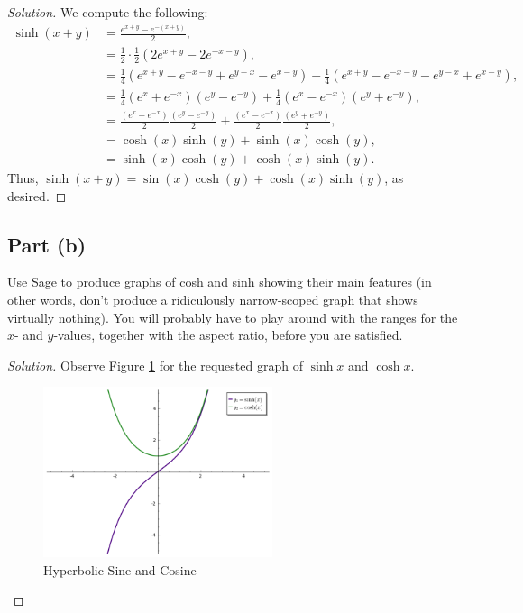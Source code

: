 \documentclass[letterpaper, 12pt]{amsart}
\theoremstyle{definition}  %
\begin{document}
			\begin{proof}[Solution]
			We compute the following:
				\begin{align*}
					\sinh(x+y) &= \frac{e^{x+y} - e^{-(x+y)}}{2}, \\
					&= \frac{1}{2} \cdot \frac{1}{2}\left( 2e^{x+y} - 2e^{-x-y} \right), \\
					&= \frac{1}{4} (e^{x+y} - e^{-x-y} + e^{y-x} - e^{x-y}) - \frac{1}{4} (e^{x+y} - e^{-x-y} - e^{y-x} + e^{x-y}), \\
					&= \frac{1}{4}(e^{x} + e^{-x})(e^{y} - e^{-y}) + \frac{1}{4}(e^{x} - e^{-x})(e^{y} + e^{-y}), \\
					&= \frac{(e^{x} + e^{-x})}{2}\frac{(e^{y} - e^{-y})}{2} + \frac{(e^{x} - e^{-x})}{2}\frac{(e^{y} + e^{-y})}{2}, \\
					&= \cosh(x)\sinh(y) + \sinh(x)\cosh(y), \\
					&= \sinh(x)\cosh(y) + \cosh(x)\sinh(y).
				\end{align*}
			Thus, $\sinh(x + y) = \sin(x)\cosh(y) + \cosh(x)\sinh(y)$, as desired.	
			\end{proof}

		\subsection*{Part (b)}
		Use Sage to produce graphs of cosh and sinh showing their main features (in other words, don’t produce a ridiculously narrow-scoped graph that shows virtually nothing). 
		You will probably have to play around with the ranges for the $x$- and $y$-values, together with the aspect ratio, before you are satisfied.

		\begin{proof}[Solution]
		Observe Figure \ref{hypGraphs} for the requested graph of $\sinh x$ and $\cosh x$.

			\begin{figure}[h]
			 	\includegraphics[width=0.6\textwidth]{figs/a.png}
			 	\caption{Hyperbolic Sine and Cosine}
			 	\label{hypGraphs}
			\end{figure} 
		\end{proof}
\end{document}
